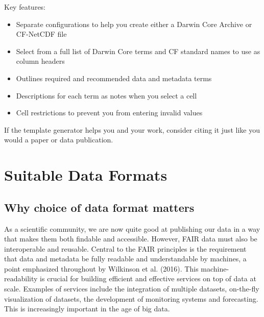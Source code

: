 \documentclass[a4paper,12pt]{article}
\begin{document}
Key features:
\begin{itemize}
\item Separate configurations to help you create either a Darwin Core Archive or CF-NetCDF file
\item Select from a full list of Darwin Core terms and CF standard names to use as column headers
\item Outlines required and recommended data and metadata terms
\item Descriptions for each term as notes when you select a cell
\item Cell restrictions to prevent you from entering invalid values 
\end{itemize}

If the template generator helps you and your work, consider citing it just like you would a paper or data publication.

%

\section{Suitable Data Formats}
\label{sec:suitable-data-formats}

\subsection{Why choice of data format matters}

As a scientific community, we are now quite good at publishing our data in a way that makes them both findable and accessible. However, FAIR data must also be interoperable and reusable. Central to the FAIR principles is the requirement that data and metadata be fully readable and understandable by machines, a point emphasized throughout by Wilkinson et al. (2016). This machine-readability is crucial for building efficient and effective services on top of data at scale. Examples of services include the integration of multiple datasets, on-the-fly visualization of datasets, the development of monitoring systems and forecasting. This is increasingly important in the age of big data.
\end{document}
